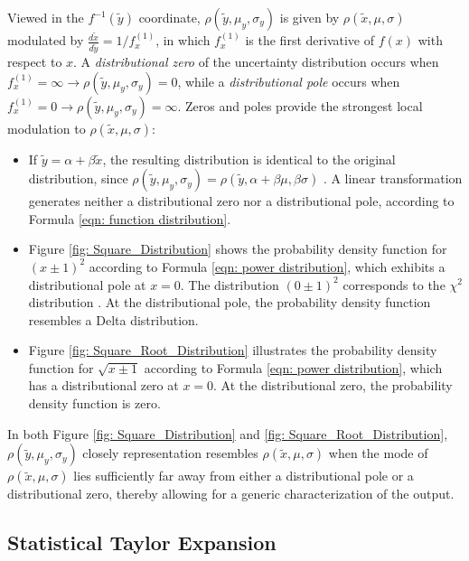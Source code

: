 \documentclass[twoside]{article}
\numberwithin{equation}{section}
\begin{document}
Viewed in the $f^{-1}(\tilde{y})$ coordinate, $\rho(\tilde{y}, \mu_y, \sigma_y)$ is given by $\rho(\tilde{x}, \mu, \sigma)$ modulated by $\frac{d\tilde{x}}{d\tilde{y}} = 1/f^{(1)}_x$, in which $f^{(1)}_x$ is the first derivative of $f(x)$ with respect to $x$.
A \emph{distributional zero} of the uncertainty distribution occurs when $f^{(1)}_x=\infty \rightarrow \rho(\tilde{y}, \mu_y, \sigma_y) = 0$, while a \emph{distributional pole} occurs when $f^{(1)}_x=0 \rightarrow \rho(\tilde{y}, \mu_y, \sigma_y) = \infty$.
Zeros and poles provide the strongest local modulation to $\rho(\tilde{x}, \mu, \sigma)$:
\begin{itemize}
\item
If $\tilde{y} = \alpha + \beta \tilde{x}$, the resulting distribution is identical to the original distribution, since $\rho(\tilde{y}, \mu_y, \sigma_y) = \rho(\tilde{y}, \alpha + \beta \mu, \beta \sigma)$ \cite{Probability_Statistics}.
A linear transformation generates neither a distributional zero nor a distributional pole, according to Formula \eqref{eqn: function distribution}.

\item 
Figure \ref{fig: Square_Distribution} shows the probability density function for $(x \pm 1)^2$ according to Formula \eqref{eqn: power distribution}, which exhibits a distributional pole at $x=0$.
The distribution $(0 \pm 1)^2$ corresponds to the $\chi^2$ distribution \cite{Statistical_Methods}.
At the distributional pole, the probability density function resembles a Delta distribution.

\item 
Figure \ref{fig: Square_Root_Distribution} illustrates the probability density function for $\sqrt{x \pm 1}$ according to Formula \eqref{eqn: power distribution}, which has a distributional zero at $x=0$.
At the distributional zero, the probability density function is zero.

\end{itemize}
In both Figure \ref{fig: Square_Distribution} and \ref{fig: Square_Root_Distribution}, $\rho(\tilde{y}, \mu_y, \sigma_y)$ closely representation resembles $\rho(\tilde{x}, \mu, \sigma)$ when the mode of $\rho(\tilde{x}, \mu, \sigma)$ lies sufficiently far away from either a distributional pole or a distributional zero, thereby allowing for a generic characterization of the output. 



\subsection{Statistical Taylor Expansion}
\end{document}
